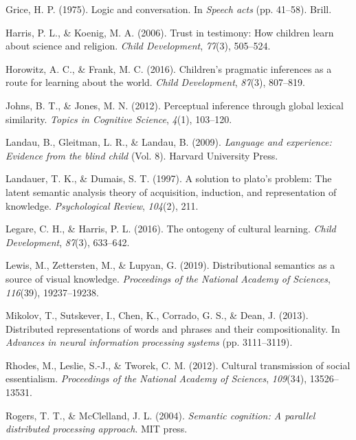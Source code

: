 \documentclass[10pt, letterpaper]{article}
\begin{document}
\leavevmode\hypertarget{ref-grice1975}{}%
Grice, H. P. (1975). Logic and conversation. In \emph{Speech acts} (pp.
41--58). Brill.

\leavevmode\hypertarget{ref-harris2006}{}%
Harris, P. L., \& Koenig, M. A. (2006). Trust in testimony: How children
learn about science and religion. \emph{Child Development},
\emph{77}(3), 505--524.

\leavevmode\hypertarget{ref-horowitz2016}{}%
Horowitz, A. C., \& Frank, M. C. (2016). Children's pragmatic inferences
as a route for learning about the world. \emph{Child Development},
\emph{87}(3), 807--819.

\leavevmode\hypertarget{ref-johns2012}{}%
Johns, B. T., \& Jones, M. N. (2012). Perceptual inference through
global lexical similarity. \emph{Topics in Cognitive Science},
\emph{4}(1), 103--120.

\leavevmode\hypertarget{ref-landau2009}{}%
Landau, B., Gleitman, L. R., \& Landau, B. (2009). \emph{Language and
experience: Evidence from the blind child} (Vol. 8). Harvard University
Press.

\leavevmode\hypertarget{ref-landauer1997}{}%
Landauer, T. K., \& Dumais, S. T. (1997). A solution to plato's problem:
The latent semantic analysis theory of acquisition, induction, and
representation of knowledge. \emph{Psychological Review}, \emph{104}(2),
211.

\leavevmode\hypertarget{ref-legare2016}{}%
Legare, C. H., \& Harris, P. L. (2016). The ontogeny of cultural
learning. \emph{Child Development}, \emph{87}(3), 633--642.

\leavevmode\hypertarget{ref-lewis2019}{}%
Lewis, M., Zettersten, M., \& Lupyan, G. (2019). Distributional
semantics as a source of visual knowledge. \emph{Proceedings of the
National Academy of Sciences}, \emph{116}(39), 19237--19238.

\leavevmode\hypertarget{ref-mikolov2013}{}%
Mikolov, T., Sutskever, I., Chen, K., Corrado, G. S., \& Dean, J.
(2013). Distributed representations of words and phrases and their
compositionality. In \emph{Advances in neural information processing
systems} (pp. 3111--3119).

\leavevmode\hypertarget{ref-rhodes2012}{}%
Rhodes, M., Leslie, S.-J., \& Tworek, C. M. (2012). Cultural
transmission of social essentialism. \emph{Proceedings of the National
Academy of Sciences}, \emph{109}(34), 13526--13531.

\leavevmode\hypertarget{ref-rogers2004}{}%
Rogers, T. T., \& McClelland, J. L. (2004). \emph{Semantic cognition: A
parallel distributed processing approach}. MIT press.
\end{document}
